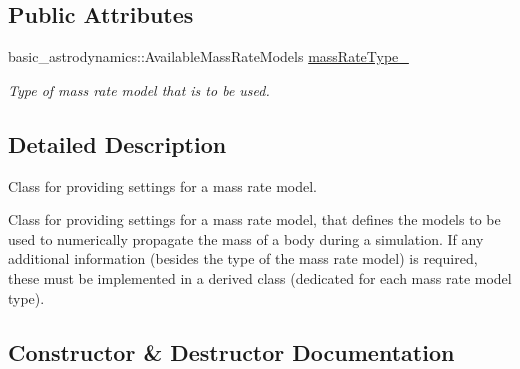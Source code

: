 \subsection*{Public Attributes}
\begin{DoxyCompactItemize}
\item 
basic\+\_\+astrodynamics\+::\+Available\+Mass\+Rate\+Models \hyperlink{classtudat_1_1simulation__setup_1_1MassRateModelSettings_aee5f1c1cf447b5097c9349b26fc1032d}{mass\+Rate\+Type\+\_\+}\hypertarget{classtudat_1_1simulation__setup_1_1MassRateModelSettings_aee5f1c1cf447b5097c9349b26fc1032d}{}\label{classtudat_1_1simulation__setup_1_1MassRateModelSettings_aee5f1c1cf447b5097c9349b26fc1032d}

\begin{DoxyCompactList}\small\item\em Type of mass rate model that is to be used. \end{DoxyCompactList}\end{DoxyCompactItemize}


\subsection{Detailed Description}
Class for providing settings for a mass rate model. 

Class for providing settings for a mass rate model, that defines the models to be used to numerically propagate the mass of a body during a simulation. If any additional information (besides the type of the mass rate model) is required, these must be implemented in a derived class (dedicated for each mass rate model type). 

\subsection{Constructor \& Destructor Documentation}

